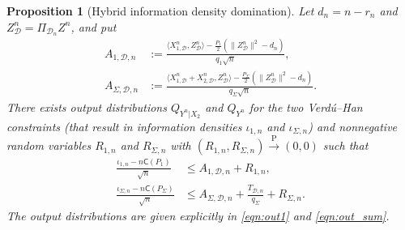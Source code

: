 \documentclass[11pt,onecolumn]{IEEEtran}
\newcommand{\calD}{\mathcal{D}}
\newcommand{\rmP}{\mathrm{P}}
\newcommand{\rvC}{\mathsf{C}}
\newtheorem{proposition}[theorem]{Proposition}
\begin{document}
\begin{proposition}[Hybrid information density domination]\label{prop:info_dens}
Let $d_n=n-r_n$ and $Z_\calD^n=\Pi_{\calD_n}Z^n$, and put
\begin{align}
    A_{1,\calD,n} &:= \frac{\langle X_{1,\calD}^n , Z_\calD^n\rangle - \frac{P_1}{2} (\|Z_\calD^n\|^2-d_n)}{q_1\sqrt{n}} ,\\
    A_{\Sigma,\calD,n} &:= \frac{\langle X_{1,\calD}^n+X_{2,\calD}^n , Z_\calD^n\rangle - \frac{P_\Sigma}{2} (\|Z_\calD^n\|^2-d_n)}{q_\Sigma\sqrt{n}} .
\end{align}
There exists output distributions $Q_{Y^n|X_2}$ and $Q_{Y^n}$ for the two Verd\'u--Han constraints (that result in information densities $\iota_{1,n}$ and $\iota_{\Sigma,n}$)  and nonnegative random variables $R_{1,n}$ and $R_{\Sigma,n}$ with $( R_{1,n}, R_{\Sigma,n})\xrightarrow{\rmP}(0,0)$ such that 
    \begin{align}
        \frac{\iota_{1,n}-n\rvC(P_1)}{\sqrt{n}} &\le A_{1,\calD,n} + R_{1,n} , \label{eqn:id_ub}\\
        \frac{\iota_{\Sigma,n}-n\rvC(P_\Sigma)}{\sqrt{n}} &\le A_{\Sigma,\calD,n} + \frac{T_{\calD,n}}{q_\Sigma}+ R_{\Sigma,n} . \label{eqn:id_ub_sum}
    \end{align}
The output distributions are given explicitly in \eqref{eqn:out1} and \eqref{eqn:out_sum}.
\end{proposition}
\end{document}
